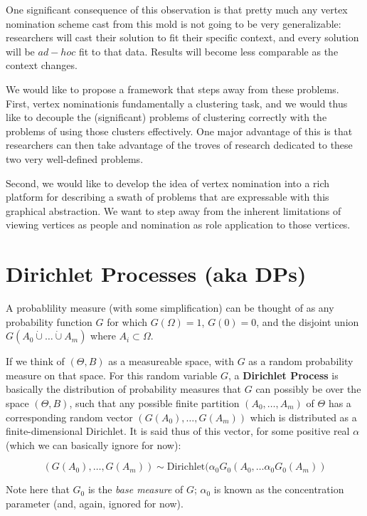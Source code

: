 \documentclass[11pt]{article}
\begin{document}
One significant consequence of this observation is that pretty much any vertex nomination scheme cast from this mold is not going to be very generalizable: researchers will cast their solution to fit their specific context, and every solution will be $ad-hoc$ fit to that data. Results will become less comparable as the context changes.

We would like to propose a framework that steps away from these problems. First, vertex nominationis fundamentally a clustering task, and we would thus like to decouple the (significant) problems of clustering correctly with the problems of using those clusters effectively. One major advantage of this is that researchers can then take advantage of the troves of research dedicated to these two very well-defined problems.

Second, we would like to develop the idea of vertex nomination into a rich platform for describing a swath of problems that are expressable with this graphical abstraction. We want to step away from the inherent limitations of viewing vertices as people and nomination as role application to those vertices.

\section{Dirichlet Processes (aka DPs)}

A probablility measure (with some simplification) can be thought of as any probability function $G$ for which $G(\Omega) = 1$, $G(0) = 0$, and the disjoint union $G(A_0 \dot{\cup} \ldots \dot{\cup} A_m)$ where $A_i \subset \Omega$.

If we think of $(\Theta, B)$ as a measureable space, with $G$ as a random probability measure on that space. For this random variable $G$, a \textbf{Dirichlet Process} is basically the distribution of probability measures that $G$ can possibly be over the space $(\Theta, B)$, such that any possible finite partition $(A_0, \ldots, A_m)$ of $\Theta$ has a corresponding random vector $(G(A_0), \ldots, G(A_m))$ which is distributed as a finite-dimensional Dirichlet. It is said thus of this vector, for some positive real $\alpha$ (which we can basically ignore for now):

\begin{equation}
(G(A_0), \ldots, G(A_m)) \sim \text{Dirichlet}(\alpha_0 G_0 (A_0, \ldots \alpha_0 G_0(A_m))
\end{equation}

Note here that $G_0$ is the \textit{base measure} of $G$; $\alpha_0$ is known as the concentration parameter (and, again, ignored for now).
\end{document}
